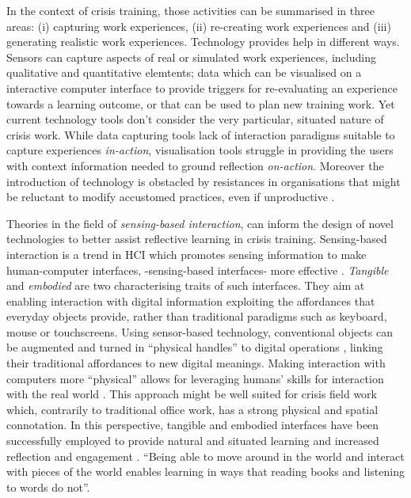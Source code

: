 In the context of crisis training, those activities can be summarised in three areas: (i) capturing work experiences, (ii) re-creating work experiences and (iii) generating realistic work experiences. Technology provides help in different ways. Sensors can capture aspects of real or simulated work experiences, including qualitative and quantitative elemtents; data which can be visualised on a interactive computer interface to provide triggers for re-evaluating an experience towards a learning outcome, or that can be used to plan new training work. Yet current technology tools don't consider the very particular, situated nature of crisis work. While data capturing tools lack of interaction paradigms suitable to capture experiences \emph{in-action}, visualisation tools struggle in providing the users with context information needed to ground  reflection \emph{on-action}. Moreover the introduction of technology is obstacled by resistances in organisations that might be reluctant to modify accustomed practices, even if unproductive \autocite{JCCM:JCCM15}.

Theories in the field of \emph{sensing-based interaction}, can inform the design of novel technologies to better assist reflective learning in crisis training. Sensing-based interaction is a trend in HCI which promotes sensing information to make human-computer interfaces, -sensing-based interfaces- more effective \autocite{Zhai:2005jm}. \emph{Tangible} and \emph{embodied} \autocite{Dourish:2001vc} are two characterising traits of such interfaces. They aim at enabling interaction with digital information exploiting the affordances that everyday objects provide, rather than traditional paradigms such as keyboard, mouse or touchscreens. Using sensor-based technology, conventional objects can be augmented and turned in ``physical handles'' to digital operations \autocite{Ishii:1997ur}, linking their traditional affordances to new digital meanings. Making interaction with computers more ``physical'' allows for leveraging humans' skills for interaction with the real world \autocite{Shaer:2009fx}. This approach might be well suited for crisis field work which, contrarily to traditional office work, has a strong physical and spatial connotation. In this perspective, tangible and embodied interfaces have been successfully employed to provide natural \autocite{Terrenghi:2005gq} and situated \autocite{Klemmer:2006ez} learning and increased reflection and engagement \autocite{Rogers:2006te}. ``Being able to move around in the world and interact with pieces of the world enables learning in ways that reading books and listening to words do not''. \autocite{Klemmer:2006ez}

